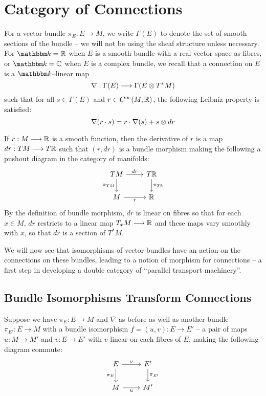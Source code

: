 \documentclass[./Thick_TQFTs_and_Quantum_Information.tex]{subfiles}
\begin{document}
\section{Category of Connections}

For a vector bundle $\pi_E : E \to M$, we write $\Gamma(E)$ to denote the set of
smooth sections of the bundle -- we will not be using the sheaf structure unless
necessary. For $\K = \R$ when $E$ is a smooth bundle with a real vector space as
fibres, or $\K = \C$ when $E$ is a complex bundle, we recall that a connection
\cite{Conn} on $E$ is a $\K$--linear map
\[
  \nabla : \Gamma(E) \stackrel{}{\longrightarrow} \Gamma(E \otimes T^*M)
\]
such that for all $s \in \Gamma(E)$ and $r \in C^{\infty}(M, \mathbb{R})$, the following
Leibniz property is satisfied:
\[
  \nabla(r \cdot s) = r \cdot \nabla(s) + s \otimes dr
\]
\begin{rmk}
If $r : M \stackrel{}{\longrightarrow} \mathbb{R}$ is a smooth function, then the derivative of $r$ is a map
$dr : TM \stackrel{}{\longrightarrow} T\mathbb{R}$ such that $(r, dr)$ is a bundle morphism making the following
a pushout diagram in the category of manifolds:
\[\begin{tikzcd}
TM \ar[d, "\pi_{TM}" left] \ar[r, "dr" above] & T\R \ar[d, "\pi_{T\R}" right]\\
M \ar[r, "r" below] & \R
\end{tikzcd}\]
By the definition of bundle morphism, $dr$ is linear on fibres so that for each
$x \in M$, $dr$ restricts to a linear map $T_xM \stackrel{}{\longrightarrow} \mathbb{R}$ and these maps vary
smoothly with $x$, so that $dr$ is a section of $T^*M$.
\end{rmk}
We will now see that isomorphisms of vector bundles have an action on the
connections on these bundles, leading to a notion of morphism for connections --
a first step in developing a double category of
``parallel transport machinery''.

\subsection{Bundle Isomorphisms Transform Connections}

Suppose we have $\pi_E : E \to M$ and $\nabla$ as before as well as another
bundle $\pi_{E'} : E \to M$ with a bundle isomorphism $f = (u, v) : E \to E'$ --
a pair of maps $u : M \to M'$ and $v : E \to E'$ with $v$ linear on each fibres
of $E$, making the following diagram commute:
\[\begin{tikzcd}
E \ar[d, "\pi_E" left] \ar[r, "v" above] & E' \ar[d, "\pi_{E'}" right]\\
M \ar[r, "u" below] & M'
\end{tikzcd}\]
\end{document}
